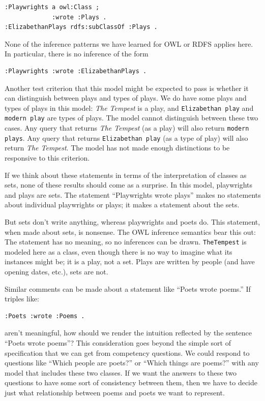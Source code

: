 \begin{lstlisting}
:Playwrights a owl:Class ;
             :wrote :Plays .
:ElizabethanPlays rdfs:subClassOf :Plays .
\end{lstlisting}

None of the inference patterns we have learned for OWL or RDFS applies
here. In particular, there is no inference of the form

\begin{lstlisting}
:Playwrights :wrote :ElizabethanPlays .
\end{lstlisting}

Another test criterion that this model might be expected to pass is
whether it can distinguish between plays and types of plays. We do have
some plays and types of plays in this model: \emph{The Tempest} is a play, and
\texttt{Elizabethan play} and \texttt{modern play} are types of plays. The model cannot
distinguish between these two cases. Any query that returns \emph{The Tempest}
(as a play) will also return \texttt{modern plays}. Any query that returns
\texttt{Elizabethan play} (as a type of play) will also return \emph{The Tempest}. The
model has not made enough distinctions to be responsive to this
criterion.

If we think about these statements in terms of the interpretation of
classes as sets, none of these results should come as a surprise. In
this model, playwrights and plays are sets. The statement
``Playwrights wrote plays'' makes no statements about individual
playwrights or plays; it makes a statement about the sets.

But sets don't write anything, whereas playwrights and poets do. This
statement, when made about sets, is nonsense. The OWL inference
semantics bear this out: The statement has no meaning, so no inferences
can be drawn. \texttt{TheTempest} is modeled here as a class, even though there
is no way to imagine what its instances might be; it is a play, not a
set. Plays are written by people (and have opening dates, etc.), sets are
not.

Similar comments can be made about a statement like ``Poets wrote
poems.'' If triples like:

\begin{lstlisting}
:Poets :wrote :Poems .
\end{lstlisting}

aren't meaningful, how should we render the intuition reflected by the
sentence ``Poets wrote poems''? This consideration goes beyond the
simple sort of specification that we can get from competency questions.
We could respond to questions like ``Which people are poets?'' or
``Which things are poems?'' with any model that includes these two
classes. If we want the answers to these two questions to have some sort
of consistency between them, then we have to decide just what
relationship between poems and poets we want to represent.


